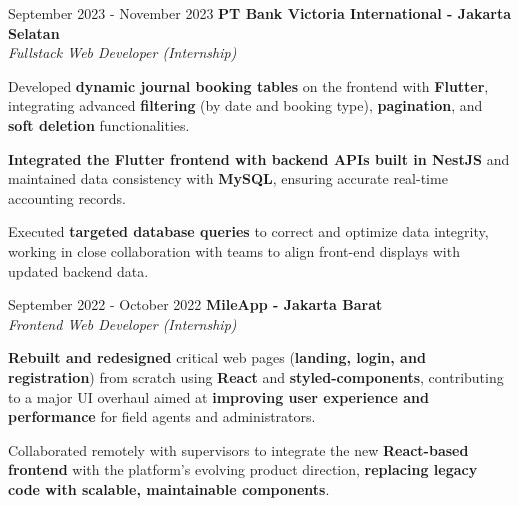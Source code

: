 \documentclass[../main.tex]{subfiles}
\begin{document}
\vspace{0.40 cm}

\begin{twocolentry}{September 2023 - November 2023}
    \textbf{PT Bank Victoria International \color{Gray}- Jakarta Selatan}\\
    \textit{Fullstack Web Developer (Internship)}
\end{twocolentry}

\vspace{0.10 cm}
\begin{onecolentry}
\begin{highlights}
    \item Developed \textbf{dynamic journal booking tables} on the frontend with \textbf{Flutter}, integrating advanced \textbf{filtering} (by date and booking type), \textbf{pagination}, and \textbf{soft deletion} functionalities.
    \item \textbf{Integrated the Flutter frontend with backend APIs built in NestJS} and maintained data consistency with \textbf{MySQL}, ensuring accurate real-time accounting records.
    \item Executed \textbf{targeted database queries} to correct and optimize data integrity, working in close collaboration with teams to align front-end displays with updated backend data.
\end{highlights}
\end{onecolentry}

\vspace{0.40 cm}

\begin{twocolentry}{September 2022 - October 2022}
    \textbf{MileApp \color{Gray}- Jakarta Barat}\\
    \textit{Frontend Web Developer (Internship)}
\end{twocolentry}

\vspace{0.10 cm}
\begin{onecolentry}
\begin{highlights}
    \item \textbf{Rebuilt and redesigned} critical web pages (\textbf{landing, login, and registration}) from scratch using \textbf{React} and \textbf{styled-components}, contributing to a major UI overhaul aimed at \textbf{improving user experience and performance} for field agents and administrators.
    \item Collaborated remotely with supervisors to integrate the new \textbf{React-based frontend} with the platform’s evolving product direction, \textbf{replacing legacy code with scalable, maintainable components}.
\end{highlights}
\end{onecolentry}
\end{document}
